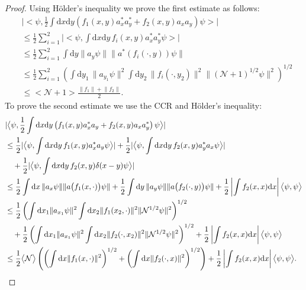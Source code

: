 \documentclass[11pt,a4paper,DIV11]{scrartcl}	%
\newcommand{\di}{\textrm{d}}		%
\newcommand{\Ncal}{\mathcal{N}}		%
\newcommand{\scal}[2]{\big<#1,#2\big>} %
\newcommand{\norm}[1]{\lVert#1\rVert}	%
\newcommand{\ev}[1]{\big<#1\big>}	%
\begin{document}
\begin{proof} Using H\"older's inequality we prove the first estimate as follows:
 \begin{align*}
  & \lvert \scal{\psi}{\frac{1}{2} \int \di x\di y \left( f_1(x,y) a^\ast_x a^\ast_y + f_2(x,y) a_x a_y \right) \psi} \rvert \\
& \leq \frac{1}{2} \sum_{i=1}^2 \lvert \scal{\psi}{\int \di x\di y\, f_i(x,y) a^\ast_x a^\ast_y \psi }\rvert \\
& \leq \frac{1}{2} \sum_{i=1}^2 \int \di y \norm{a_y \psi} \norm{a^\ast(f_i(\cdot,y))\psi} \\
& \leq \frac{1}{2} \sum_{i=1}^2 \left( \int \di y_1\, \norm{a_{y_1}\psi}^2 \int \di y_2\, \norm{f_i(\cdot,y_2)}^2 \norm{(\Ncal+1)^{1/2} \psi}^2 \right)^{1/2} \\
& \leq \ev{\Ncal+1} \frac{\norm{f_1}+\norm{f_2}}{2}.
 \end{align*}
To prove the second estimate we use the CCR and H\"older's inequality:
 \begin{align*}
& \lvert \scal{\psi}{\frac{1}{2} \int \di x\di y \left( f_1(x,y) a^\ast_x a_y + f_2(x,y) a_x a^\ast_y \right)  \psi} \rvert\\
& \leq \frac{1}{2} \lvert \scal{\psi}{\int \di x\di y\, f_1(x,y) a^\ast_x a_y \psi} \rvert + \frac{1}{2}\lvert \scal{\psi}{\int \di x \di y\, f_2(x,y) a^\ast_y a_x \psi}\rvert \\
&\quad + \frac{1}{2} \lvert \scal{\psi}{\int \di x \di y\, f_2(x,y) \delta(x-y) \psi}\rvert \\
& \leq \frac{1}{2} \int \di x\, \norm{a_x \psi} \norm{a\big(f_1(x,\cdot)\big)\psi} + \frac{1}{2} \int \di y\, \norm{a_y\psi} \norm{a\big(f_2(\cdot,y)\big)\psi} + \frac{1}{2} \left\lvert \int f_2(x,x) \di x \right\rvert \scal{\psi}{\psi} \\
& \leq \frac{1}{2} \left( \int \di x_1 \norm{a_{x_1}\psi}^2 \int \di x_2 \norm{f_1(x_2,\cdot)}^2 \norm{\Ncal^{1/2}\psi}^2 \right)^{1/2}\\
& \quad + \frac{1}{2} \left( \int \di x_1 \norm{a_{x_1}\psi}^2 \int \di x_2 \norm{f_2(\cdot,x_2)}^2 \norm{\Ncal^{1/2}\psi}^2 \right)^{1/2} + \frac{1}{2}\left\lvert \int f_2(x,x) \di x\right\rvert \scal{\psi}{\psi} \\
& \leq \frac{1}{2}\ev{\Ncal} \left(\left(\int \di x \norm{f_1(x,\cdot)}^2 \right)^{1/2} + \left(\int \di x \norm{f_2(\cdot,x)}^2 \right)^{1/2} \right) + \frac{1}{2}\left\lvert \int f_2(x,x) \di x\right\rvert \scal{\psi}{\psi}. 	\qedhere
 \end{align*}
\end{proof}
\end{document}
